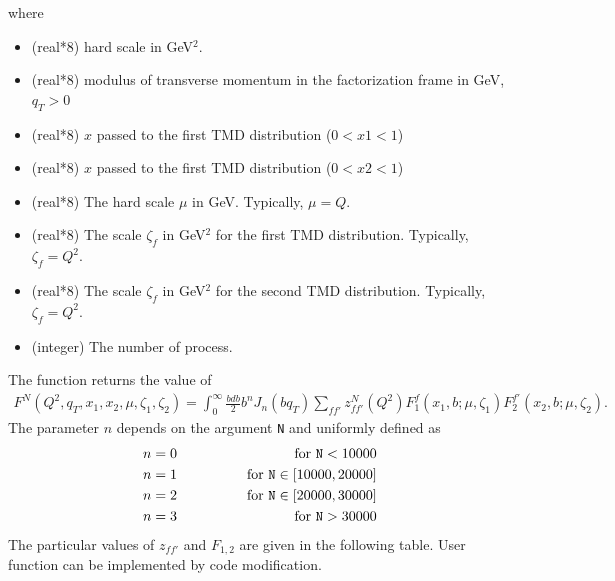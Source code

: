 \documentclass[prd,nofootinbib,eqsecnum,final]{revtex4}
\renewcommand{\(}{\left(}
\renewcommand{\)}{\right)}
\renewcommand{\[}{\left[}
\renewcommand{\]}{\right]}
\begin{document}
where 
\begin{itemize}
\item [\texttt{Q2}] (real*8) hard scale in GeV$^2$.
\item [\texttt{qT}] (real*8) modulus of transverse momentum in the factorization frame in GeV, $q_T>0$
\item [\texttt{x1}] (real*8) $x$ passed to the first TMD distribution  ($0<x1<1$)
\item [\texttt{x2}] (real*8) $x$ passed to the first TMD distribution ($0<x2<1$)
\item [\texttt{mu}] (real*8) The hard scale $\mu$ in GeV. Typically, $\mu=Q$.
\item [\texttt{zeta1}] (real*8) The scale $\zeta_f$ in GeV$^2$ for the first TMD distribution. Typically, $\zeta_f=Q^2$.
\item [\texttt{zeta2}] (real*8) The scale $\zeta_f$ in GeV$^2$ for the second TMD distribution. Typically, $\zeta_f=Q^2$.
\item [\texttt{N}] (integer) The number of process.
\end{itemize}
The function returns the value of 
\begin{eqnarray}
F^N(Q^2,q_T,x_1,x_2,\mu,\zeta_1,\zeta_2)=\int_0^\infty \frac{bdb}{2}b^n J_n(bq_T)\sum_{ff'} z^N_{ff'}(Q^2) F_1^f(x_1,b;\mu,\zeta_1)F_2^{f'}(x_2,b;\mu,\zeta_2).
\end{eqnarray}
The parameter $n$ depends on the argument \texttt{N} and uniformly defined as 
\begin{eqnarray*}
n=0 &\qquad\qquad& \text{for \texttt{N}}<10000
\\
n=1 &\qquad\qquad& \text{for \texttt{N}}\in[10000,20000]
\\
n=2 &\qquad\qquad& \text{for \texttt{N}}\in[20000,30000]
\\
n=3 &\qquad\qquad& \text{for \texttt{N}}>30000
\end{eqnarray*}
The particular values of $z_{ff'}$ and $F_{1,2}$ are given in the following table. User function can be implemented by code modification.
\end{document}

